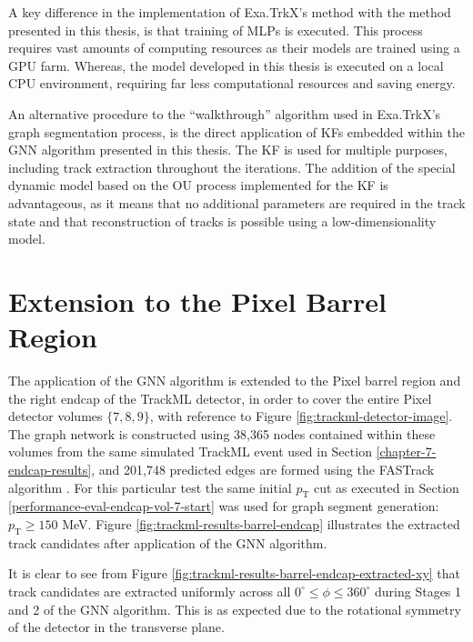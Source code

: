 A key difference in the implementation of Exa.TrkX’s method with the method presented in this thesis, is that training of MLPs is executed. This process requires vast amounts of computing resources as their models are trained using a GPU farm. Whereas, the model developed in this thesis is executed on a local CPU environment, requiring far less computational resources and saving energy.

An alternative procedure to the “walkthrough” algorithm used in Exa.TrkX’s graph segmentation process, is the direct application of KFs embedded within the GNN algorithm presented in this thesis. The KF is used for multiple purposes, including track extraction throughout the iterations. The addition of the special dynamic model based on the OU process implemented for the KF is advantageous, as it means that no additional parameters are required in the track state and that reconstruction of tracks is possible using a low-dimensionality model.










\section{Extension to the Pixel Barrel Region}
\label{chapter-7-outlook}


The application of the GNN algorithm is extended to the Pixel barrel region and the right endcap of the TrackML detector, in order to cover the entire Pixel detector volumes $\{7, 8, 9\}$, with reference to Figure \ref{fig:trackml-detector-image}. The graph network is constructed using 38,365 nodes contained within these volumes from the same simulated TrackML event used in Section \ref{chapter-7-endcap-results}, and 201,748 predicted edges are formed using the FASTrack algorithm \cite{Dmitry-fasttrack-addtest}. For this particular test the same initial $p_{\text{T}}$ cut as executed in Section \ref{performance-eval-endcap-vol-7-start} was used for graph segment generation: $p_{\text{T}} \ge 150$ MeV. Figure \ref{fig:trackml-results-barrel-endcap} illustrates the extracted track candidates after application of the GNN algorithm. 

It is clear to see from Figure \ref{fig:trackml-results-barrel-endcap-extracted-xy} that track candidates are extracted uniformly across all $ 0^{\circ} \leq \phi \leq 360^{\circ}$ during Stages 1 and 2 of the GNN algorithm. This is as expected due to the rotational symmetry of the detector in the transverse plane. 

